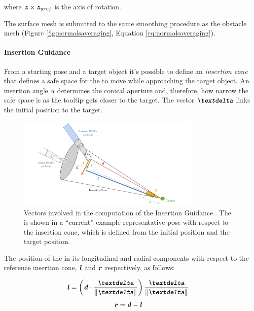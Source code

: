 \documentclass[../main.tex]{subfiles}
\begin{document}
where $\textbf{\textit{z}} \times \textbf{\textit{z}}_{proj}$ is the axis of rotation.

The surface mesh is submitted to the same smoothing procedure as the obstacle mesh (Figure \ref{fig:normalsaveraging}, Equation \ref{eq:normalsaveraging}).




\paragraph{Insertion Guidance} From a starting pose and a target object it's possible to define an \textit{insertion cone} that defines a safe space for the \ee to move while approaching the target object. An insertion angle $\alpha$ determines the conical aperture and, therefore, how narrow the safe space is as the tooltip gets closer to the target. The vector $\vect{\textdelta}$ links the initial \psm position to the target. 

\begin{figure}
    \centering
    \includegraphics[width=0.8\textwidth]{images/insertion_guidance.png}
    \caption{Vectors involved in the computation of the Insertion Guidance \vf. The \psm is shown in a ``current'' example representative pose with respect to the insertion cone, which is defined from the initial \psm position and the target position.}
    \label{fig:insertionguidance}
\end{figure}

The position of the \ee in its longitudinal and radial components with respect to the reference insertion cone, $\textbf{\textit{l}}$ and $\textbf{\textit{r}}$ respectively, as follows:

\begin{equation}
    \vect{l} =  \left(\vect{d}\cdot \frac{\vect{\textdelta}}{\|\vect{\textdelta}\|} \right) \frac{\vect{\textdelta}}{\|\vect{\textdelta}\|}
\end{equation} 
\begin{equation}
    \textbf{\textit{r}} = \textbf{\textit{d}} - \textbf{\textit{l}}
\end{equation}
\end{document}
